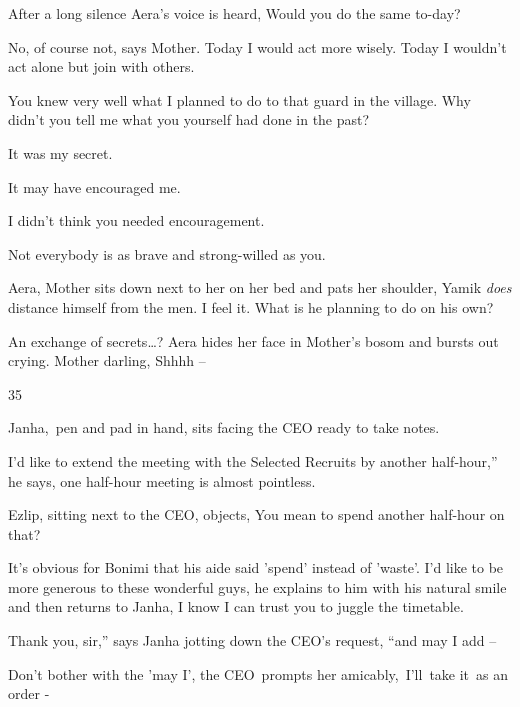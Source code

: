 \documentclass[letterpaper]{article}
\begin{document}
After a long silence Aera's voice is heard, {\textquotedbl}Would you do the same to-day?{\textquotedbl} 

{\textquotedbl}No, of course not,{\textquotedbl} says Mother. {\textquotedbl}Today I would act more wisely. Today I
wouldn't act alone but join with others.{\textquotedbl} 

{\textquotedbl}You knew very well what I planned to do to that guard in the village. Why didn't you tell me what you
yourself had done in the past?{\textquotedbl} 

{\textquotedbl}It was my secret.{\textquotedbl} 

{\textquotedbl}It may have encouraged me.{\textquotedbl} 

{\textquotedbl}I didn't think you needed encouragement.{\textquotedbl} \ 

{\textquotedbl}Not everybody is as brave and strong-willed as you.{\textquotedbl}

{\textquotedbl}Aera,{\textquotedbl} Mother sits down next to her on her bed and pats her shoulder, {\textquotedbl}Yamik
\textit{does} distance himself from the men. I feel it. What is he planning to do on his own?{\textquotedbl} 

{\textquotedbl}An exchange of secrets{\dots}?{\textquotedbl} Aera hides her face in Mother's bosom and bursts out
crying. {\textquotedbl}Mother darling, Shhhh --{\textquotedbl} 


\bigskip

35\ 

Janha,~pen and pad in hand, sits facing the CEO ready to take notes.\ 

{\textquotedbl}I'd like to extend the meeting with the Selected Recruits by another half-hour,'' he says,
{\textquotedbl}one half-hour meeting is almost pointless.{\textquotedbl}\textcolor{red}{\ }

Ezlip, sitting next to the CEO, objects, {\textquotedbl}You mean to spend another half{}-hour on that?{\textquotedbl}

It's obvious for Bonimi that his aide said 'spend' instead of {}'waste'. {\textquotedbl}I'd like to be more generous to
these wonderful guys,{\textquotedbl} he explains to him with his natural smile and then returns to Janha,
{\textquotedbl}I know I can trust you to juggle the timetable.{\textquotedbl}\ 

{\textquotedbl}Thank you, sir,'' says Janha jotting down the CEO's request, ``and may I add --{\textquotedbl} 

{\textquotedbl}Don't bother with the 'may I',{\textquotedbl} the CEO\ prompts her amicably,\ {\textquotedbl}I{}'ll\ take
it\textcolor{red}{\ }as an order -{\textquotedbl}\ 
\end{document}
